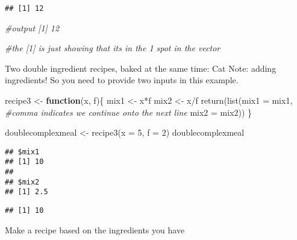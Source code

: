 \documentclass[
]{article}
\newenvironment{Shaded}{\begin{snugshade}}{\end{snugshade}}
\newcommand{\AttributeTok}[1]{\textcolor[rgb]{0.77,0.63,0.00}{#1}}
\newcommand{\CommentTok}[1]{\textcolor[rgb]{0.56,0.35,0.01}{\textit{#1}}}
\newcommand{\ControlFlowTok}[1]{\textcolor[rgb]{0.13,0.29,0.53}{\textbf{#1}}}
\newcommand{\DecValTok}[1]{\textcolor[rgb]{0.00,0.00,0.81}{#1}}
\newcommand{\FunctionTok}[1]{\textcolor[rgb]{0.00,0.00,0.00}{#1}}
\newcommand{\NormalTok}[1]{#1}
\newcommand{\OtherTok}[1]{\textcolor[rgb]{0.56,0.35,0.01}{#1}}
\newcommand{\SpecialCharTok}[1]{\textcolor[rgb]{0.00,0.00,0.00}{#1}}
\begin{document}
\begin{verbatim}
## [1] 12
\end{verbatim}

\begin{Shaded}
\begin{Highlighting}[]
\CommentTok{\#output [1] 12}

\CommentTok{\#the [1] is just showing that it\textquotesingle{}s in the 1 spot in the vector}
\end{Highlighting}
\end{Shaded}

Two double ingredient recipes, baked at the same time: Cat Note: adding
ingredients! So you need to provide two inputs in this example.

\begin{Shaded}
\begin{Highlighting}[]
\NormalTok{recipe3 }\OtherTok{\textless{}{-}} \ControlFlowTok{function}\NormalTok{(x, f)\{}
\NormalTok{  mix1 }\OtherTok{\textless{}{-}}\NormalTok{ x}\SpecialCharTok{*}\NormalTok{f}
\NormalTok{  mix2 }\OtherTok{\textless{}{-}}\NormalTok{ x}\SpecialCharTok{/}\NormalTok{f}
  \FunctionTok{return}\NormalTok{(}\FunctionTok{list}\NormalTok{(}\AttributeTok{mix1 =}\NormalTok{ mix1, }\CommentTok{\#comma indicates we continue onto the next line}
              \AttributeTok{mix2 =}\NormalTok{ mix2))}
\NormalTok{\}}

\NormalTok{doublecomplexmeal }\OtherTok{\textless{}{-}} \FunctionTok{recipe3}\NormalTok{(}\AttributeTok{x =} \DecValTok{5}\NormalTok{, }\AttributeTok{f =} \DecValTok{2}\NormalTok{)}
\NormalTok{doublecomplexmeal}
\end{Highlighting}
\end{Shaded}

\begin{verbatim}
## $mix1
## [1] 10
## 
## $mix2
## [1] 2.5
\end{verbatim}

\begin{Shaded}
\end{Shaded}

\begin{verbatim}
## [1] 10
\end{verbatim}

Make a recipe based on the ingredients you have
\end{document}
